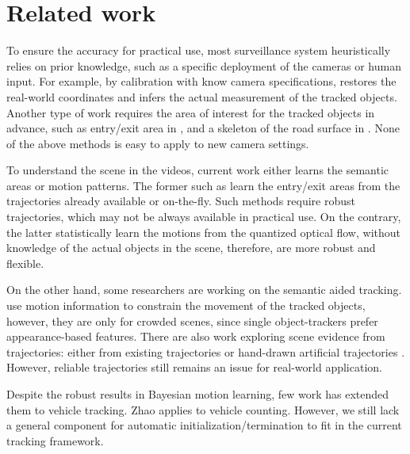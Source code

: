 \section{Related work}

\label{sec:semantic-related}
To ensure the accuracy for practical use, most surveillance system heuristically relies on prior knowledge, such as a specific deployment of the cameras or human input. For example, by calibration with know camera specifications, \cite{cheng2011intelligent,corral2017slot} restores the real-world coordinates and infers the actual measurement of the tracked objects. Another type of work requires the area of interest for the tracked objects in advance, such as entry/exit area in \cite{tamersoy2009robust,rodriguez2010adaptive,mishra2013video}, and a skeleton of the road surface in \cite{bas2007automatic}. None of the above methods is easy to apply to new camera settings.

To understand the scene in the videos, current work either learns the semantic areas or motion patterns. The former such as \cite{tung2011goal,nedrich2013detecting,yang2012multi} learn the entry/exit areas from the trajectories already available or on-the-fly. Such methods require robust trajectories, which may not be always available in practical use.
On the contrary, the latter \cite{wang2009unsupervised,kuettel2010s,hospedales2009markov,liao2015video} statistically learn the motions from the quantized optical flow, without knowledge of the actual objects in the scene, therefore, are more robust and flexible. 

On the other hand, some researchers are working on the semantic aided tracking. \cite{zhao2012tracking,kratz2010tracking} use motion information to constrain the movement of the tracked objects, however, they are only for crowded scenes, since single object-trackers prefer appearance-based features.
There are also work exploring scene evidence from trajectories: either from existing trajectories \cite{song2010online} or hand-drawn artificial trajectories \cite{manen2014appearances}. However, reliable trajectories still remains an issue for real-world application.

Despite the robust results in Bayesian motion learning, few work has extended them to vehicle tracking.
Zhao \etc \cite{zhao2013counting} applies \cite{wang2009unsupervised} to vehicle counting. However, we still lack a general component for automatic initialization/termination to fit in the current tracking framework.
